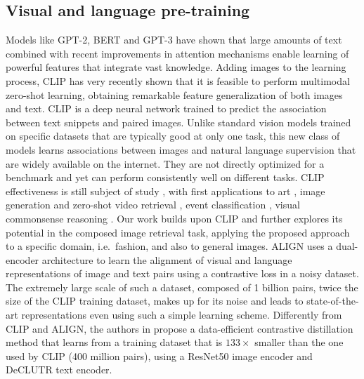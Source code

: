 \documentclass[acmlarge]{acmart}
\begin{document}
\subsection*{Visual and language pre-training}
Models like GPT-2, BERT \cite{devlin2019bert} and GPT-3 \cite{brown2020language} have shown that large amounts of text combined with recent improvements in attention mechanisms enable learning of powerful features that integrate vast knowledge. 
Adding images to the learning process, CLIP \cite{radford2021learning} has very recently shown that it is feasible to perform multimodal zero-shot learning, obtaining remarkable feature generalization of both images and text. 
CLIP is a deep neural network trained to predict the association between text snippets and paired images. Unlike standard vision models trained on specific datasets that are typically good at only one task, this new class of models learns associations between images and natural language supervision that are widely available on the internet.
They are not directly optimized for a benchmark and yet can perform consistently well on different tasks.
CLIP effectiveness is still subject of study \cite{agarwal2021evaluating}, with first applications to art \cite{conde2021clip}, image generation \cite{cimino2021generating} and zero-shot video retrieval \cite{fang2021clip2video}, event classification \cite{li2022clip}, visual commonsense reasoning \cite{wang2022cliptd}. 
Our work builds upon CLIP and further explores its potential in the composed image retrieval task, applying the proposed approach to a specific domain, i.e.~fashion, and also to general images.
ALIGN \cite{jia2021scaling} uses a  dual-encoder architecture to learn the alignment of visual and language representations of image and text pairs using a contrastive loss in a noisy dataset. The extremely large scale of such a dataset, composed of 1 billion pairs, twice the size of the CLIP training dataset, makes up for its noise and leads to state-of-the-art representations even using such a simple learning scheme.
Differently from CLIP and ALIGN, the authors in \cite{Cheng_2021_CVPR} propose a data-efficient contrastive distillation method that learns from a training dataset that is $133\times$ smaller than the one used by CLIP (400 million pairs), using a ResNet50 image encoder and DeCLUTR text encoder.
\end{document}
